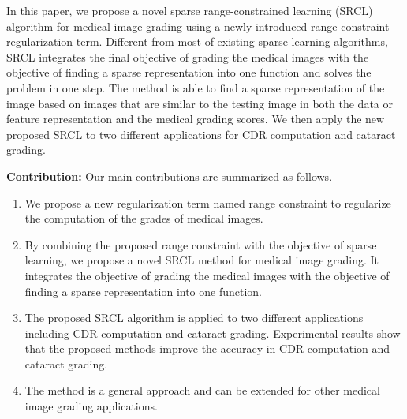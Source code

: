 \documentclass[journal]{IEEEtran}
\begin{document}
     In this paper,
     we propose  a novel sparse range-constrained learning (SRCL)
     algorithm for medical image grading using a newly introduced range constraint regularization term. Different from most of existing
     sparse learning algorithms, SRCL integrates the final objective of grading the medical images  with the objective of finding a sparse representation into one function and solves the problem in one step. The method is able to find a sparse
     representation of the image based on images that are similar to the testing image in
     both the data or feature representation and the medical grading scores.
      We then apply
     the new proposed SRCL to two different applications for CDR computation and cataract grading.

    \textbf{Contribution:} Our main contributions are summarized as
    follows.

     \begin{enumerate}
     	 \item We propose a new regularization term named range constraint to regularize the computation of the grades of medical images.
     	\item By combining the proposed range constraint with the objective of sparse learning, we propose a novel    SRCL method for medical image grading. It integrates the   objective of grading the medical images with the objective of finding a sparse representation into one function.
     	 \item The proposed SRCL algorithm is applied to two different applications including CDR computation   and cataract grading.
     	  Experimental results show that the proposed methods improve the accuracy in  CDR computation and cataract grading.
     	\item The method is a general approach and can be extended for other medical image grading applications.


     \end{enumerate}
\end{document}
